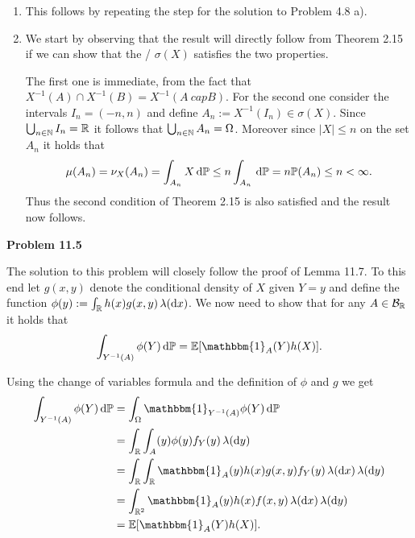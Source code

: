 \begin{enumerate}[label={(\alph*)}]
\item This follows by repeating the step for the solution to Problem 4.8 a). 
%

\item We start by observing that the result will directly follow from Theorem 2.15 if we can show that the \sigalg/ $\sigma(X)$ satisfies the two properties.

The first one is immediate, from the fact that $X^{-1}(A) \cap X^{-1}(B) = X^{-1}(A\ cap B)$. For the second one consider the intervals $I_n = (-n,n)$ and define $A_n := X^{-1}(I_n) \in \sigma(X)$. Since $\bigcup_{n \in \mathbb N} I_n = \mathbb R$ it follows that $\bigcup_{n \in \mathbb N} A_n = \Omega$. Moreover since $|X| \le n$ on the set $A_n$ it holds that
\[
	\mu(A_n) = \nu_X(A_n) = \int_{A_n} X \, \mathrm{d} \mathbb P \le n \int_{A_n} \, \mathrm{d} \mathbb P = n \mathbb P(A_n) \le n < \infty.
\]
Thus the second condition of Theorem 2.15 is also satisfied and the result now follows.

	
\end{enumerate}

\bigskip

\textbf{Problem 11.5}

The solution to this problem will closely follow the proof of Lemma 11.7. To this end let $g(x,y)$ denote the conditional density of $X$ given $Y = y$ and define the function $\phi(y) := \int_{\mathbb R} h(x) g(x,y) \, \lambda(\mathrm{d} x)$. We now need to show that for any $A \in \mathcal B_{\mathbb R}$ it holds that
\[
	\int_{Y^{-1}(A)} \phi(Y) \, \dd \bbP = \bbE[\mathbbm{1}_A(Y) h(X)].
\]

Using the change of variables formula and the definition of $\phi$ and $g$ we get
\begin{align*}
	\int_{Y^{-1}(A)} \phi(Y) \, \dd \bbP &= \int_\Omega \mathbbm{1}_{Y^{-1}(A)} \phi(Y) \, \dd \bbP\\
	&= \int_\bbR \int_A(y) \phi(y) f_Y(y) \, \lambda(\dd y)\\
	&= \int_{\bbR} \int_\bbR \mathbbm{1}_A(y) h(x) g(x,y) f_Y(y)  \, \lambda(\dd x) \, \lambda(\dd y)\\
	&= \int_{\bbR^2} \mathbbm{1}_{A}(y) h(x) f(x,y) \, \lambda(\dd x) \, \lambda(\dd y)\\
	&= \bbE[\mathbbm{1}_{A}(Y) h(X)].
\end{align*}



